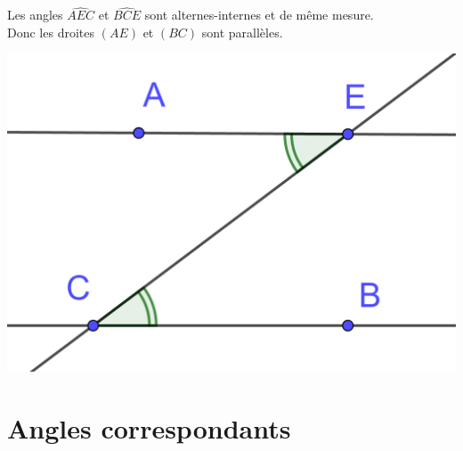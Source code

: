 \documentclass[12pt,a4paper]{article}
\begin{document}
\begin{myex}
	\begin{multicols}{2}
		
		Les angles $\widehat{AEC}$ et $\widehat{BCE}$ sont alternes-internes et de même mesure. \\
		
		Donc les droites $(AE)$ et $(BC)$ sont parallèles.
		
		\begin{center}
			\includegraphics[scale=0.15]{alt_int3}
		\end{center}
	\end{multicols}
\end{myex}



\section{Angles correspondants}
\end{document}
